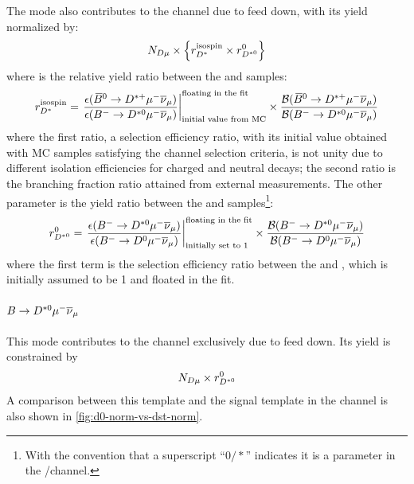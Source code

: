 The \Dstarp\muon mode also contributes to the \Dz channel due to feed down,
with its yield normalized by:
\begin{equation}
    N_{D\mu} \times \left\{
        r_{{{D}^*}}^\text{isospin} \times r_{{{D}^{*0}}}^{0}
    \right\}
\end{equation}
where \fitDstISO is the relative yield ratio between the \Dstarp\muon and
\Dstarz\muon samples:
\begin{equation}
    r_{{{D}^*}}^\text{isospin} =
    \left.\frac{
        \epsilon({{\kern 0.18em\overline{\kern -0.18em B}}{}^0} \rightarrow {\ensuremath{{D}^{*+}}}{\ensuremath{\mu^-}}{\ensuremath{{\overline{\nu}}_\mu}})
    }{
        \epsilon({{{B}^-}} \rightarrow {\ensuremath{{D}^{*0}}}{\ensuremath{\mu^-}}{\ensuremath{{\overline{\nu}}_\mu}})
    }\right|_\text{initial value from MC}^\text{floating in the fit}\times
    \frac{
        \mathcal{B}({{\kern 0.18em\overline{\kern -0.18em B}}{}^0} \rightarrow {\ensuremath{{D}^{*+}}}{\ensuremath{\mu^-}}{\ensuremath{{\overline{\nu}}_\mu}})
    }{
        \mathcal{B}({{{B}^-}} \rightarrow {\ensuremath{{D}^{*0}}}{\ensuremath{\mu^-}}{\ensuremath{{\overline{\nu}}_\mu}})
    }
\end{equation}
where the first ratio, a selection efficiency ratio,
with its initial value obtained with MC samples satisfying the \Dz channel
selection criteria,
is not unity due to different isolation efficiencies for charged
\Dstarp and neutral \Dstarz decays;
the second ratio is the branching fraction ratio attained from external
measurements.
The other parameter \fitnormfd is the yield ratio between the \Dstarz\muon and
\Dz\muon samples\footnote{
    With the convention that a superscript ``$0/*$'' indicates
    it is a parameter in the \Dz/\Dstar channel.
}:
\begin{equation}
    r_{{{D}^{*0}}}^{0} =
    \left.\frac{
        \epsilon({{{B}^-}} \rightarrow {\ensuremath{{D}^{*0}}}{\ensuremath{\mu^-}}{\ensuremath{{\overline{\nu}}_\mu}})
    }{
        \epsilon({{{B}^-}} \rightarrow {\ensuremath{{D}^0}}{\ensuremath{\mu^-}}{\ensuremath{{\overline{\nu}}_\mu}})
    }\right|_\text{initially set to 1}^\text{floating in the fit} \times
    \frac{
        \mathcal{B}({{{B}^-}} \rightarrow {\ensuremath{{D}^{*0}}}{\ensuremath{\mu^-}}{\ensuremath{{\overline{\nu}}_\mu}})
    }{
        \mathcal{B}({{{B}^-}} \rightarrow {\ensuremath{{D}^0}}{\ensuremath{\mu^-}}{\ensuremath{{\overline{\nu}}_\mu}})
    }
\end{equation}
where the first term is the selection efficiency ratio between the \Dz\mun and
\Dstarz\mun, which is initially assumed to be 1 and floated in the fit.

\paragraph{$B \rightarrow D^{*0}{\mu^-}{{\overline{\nu}}_\mu}$}
This mode contributes to the \Dz channel exclusively due to feed down.
Its yield is constrained by
\begin{equation}
    N_{D\mu} \times r_{{{D}^{*0}}}^{0}
\end{equation}
A comparison between this template and the signal template in the \Dz
channel is also shown in \cref{fig:d0-norm-vs-dst-norm}.

